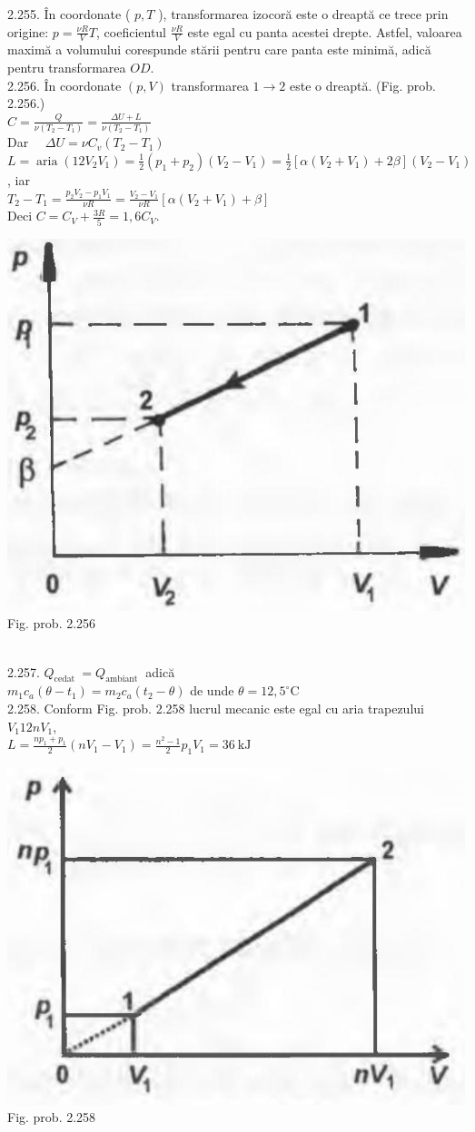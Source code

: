 2.255. În coordonate ( $p, T$ ), transformarea izocoră este o dreaptă ce trece prin origine: $p=\frac{\nu R}{V} T$, coeficientul $\frac{\nu R}{V}$ este egal cu panta acestei drepte. Astfel, valoarea maximă a volumului corespunde stării pentru care panta este minimă, adică pentru transformarea $O D$.\\

2.256. În coordonate $(p, V)$ transformarea $1 \rightarrow 2$ este o dreaptă. (Fig. prob. 2.256.)\\ $C=\frac{Q}{\nu\left(T_{2}-T_{1}\right)}=\frac{\Delta U+L}{\nu\left(T_{2}-T_{1}\right)}$\\ Dar $\quad \Delta U=\nu C_{v}\left(T_{2}-T_{1}\right)$\\ $L=\operatorname{aria}\left(12 V_{2} V_{1}\right)=\frac{1}{2}\left(p_{1}+p_{2}\right)\left(V_{2}-V_{1}\right)=\frac{1}{2}\left[\alpha\left(V_{2}+V_{1}\right)+2 \beta\right]\left(V_{2}-V_{1}\right)$, iar\\ $T_{2}-T_{1}=\frac{p_{2} V_{2}-p_{1} V_{1}}{\nu R}=\frac{V_{2}-V_{1}}{\nu R}\left[\alpha\left(V_{2}+V_{1}\right)+\beta\right]$\\ Deci $C=C_{V}+\frac{3 R}{5}=1,6 C_{V}$.\\ \begin{center} \includegraphics[width=0.4\linewidth]{images/2025_07_01_5b3ff9fa0d508c8e9f17g-325}\\ Fig. prob. 2.256 \end{center}\\

2.257. $Q_{\text {cedat }}=Q_{\text {ambiant }}$ adică\\ $m_{1} c_{a}\left(\theta-t_{1}\right)=m_{2} c_{a}\left(t_{2}-\theta\right)$ de unde $\theta=12,5^{\circ} \mathrm{C}$\\

2.258. Conform Fig. prob. 2.258 lucrul mecanic este egal cu aria trapezului $V_{1} 12 n V_{1}$,\\ $L=\frac{n p_{1}+p_{1}}{2}\left(n V_{1}-V_{1}\right)=\frac{n^{2}-1}{2} p_{1} V_{1}=36 \mathrm{~kJ}$\\ \begin{center} \includegraphics[width=0.4\linewidth]{images/2025_07_01_5b3ff9fa0d508c8e9f17g-326}\\ Fig. prob. 2.258 \end{center}\\

